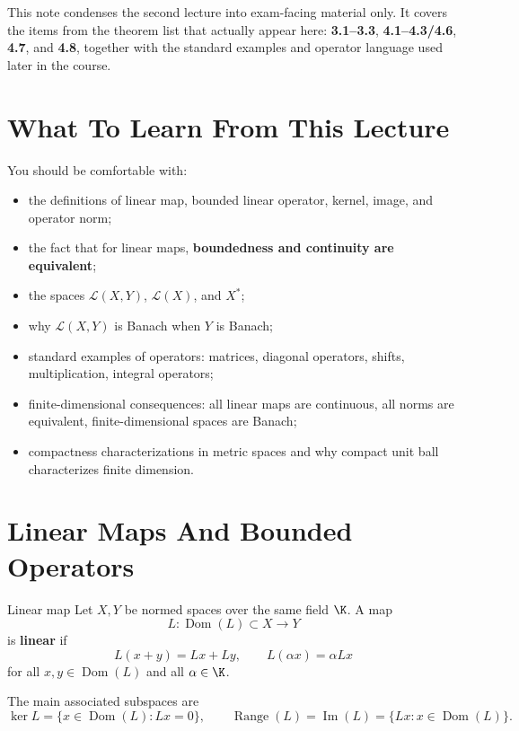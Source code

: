 \documentclass[header={Lecture 2 Exam Study Notes}]{study-note}
\begin{document}

\vspace{0.8em}

\begin{focusbox}
This note condenses the second lecture into exam-facing material only. It covers the items from the theorem list that actually appear here: \textbf{3.1--3.3}, \textbf{4.1--4.3/4.6}, \textbf{4.7}, and \textbf{4.8}, together with the standard examples and operator language used later in the course.
\end{focusbox}

\tableofcontents

\section{What To Learn From This Lecture}

\begin{focusbox}
You should be comfortable with:
\begin{itemize}
\item the definitions of linear map, bounded linear operator, kernel, image, and operator norm;
\item the fact that for linear maps, \textbf{boundedness and continuity are equivalent};
\item the spaces $\mathcal L(X,Y)$, $\mathcal L(X)$, and $X^*$;
\item why $\mathcal L(X,Y)$ is Banach when $Y$ is Banach;
\item standard examples of operators: matrices, diagonal operators, shifts, multiplication, integral operators;
\item finite-dimensional consequences: all linear maps are continuous, all norms are equivalent, finite-dimensional spaces are Banach;
\item compactness characterizations in metric spaces and why compact unit ball characterizes finite dimension.
\end{itemize}
\end{focusbox}

\section{Linear Maps And Bounded Operators}

\begin{defbox}{Linear map}
Let $X,Y$ be normed spaces over the same field $\K$. A map
\[
L:\operatorname{Dom}(L)\subset X\to Y
\]
is \textbf{linear} if
\[
L(x+y)=Lx+Ly,
\qquad
L(\alpha x)=\alpha Lx
\]
for all $x,y\in \operatorname{Dom}(L)$ and all $\alpha\in\K$.

The main associated subspaces are
\[
\ker L=\{x\in\operatorname{Dom}(L):Lx=0\},
\qquad
\operatorname{Range}(L)=\operatorname{Im}(L)=\{Lx:x\in\operatorname{Dom}(L)\}.
\]
\end{defbox}
\end{document}
